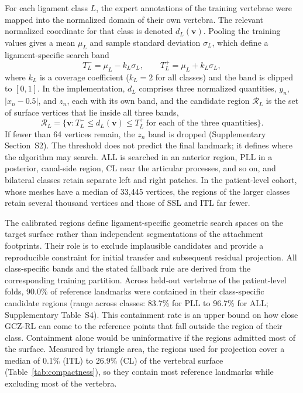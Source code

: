 \documentclass[5p,times,twocolumn,authoryear]{elsarticle}
\newif\ifhighlight
\newcommand{\rev}[1]{\ifhighlight{\color{revcolor}#1}\else#1\fi}
\begin{document}
For each ligament class $L$, the expert annotations of the training vertebrae were mapped into the normalized domain of their own vertebra. The relevant normalized coordinate for that class is denoted $d_L(\mathbf{v})$. Pooling the training values gives a mean $\mu_L$ and sample standard deviation $\sigma_L$, which define a ligament-specific search band
\begin{equation}
  T_L^- = \mu_L - k_L\sigma_L, \qquad
  T_L^+ = \mu_L + k_L\sigma_L ,
  \label{eq:threshold_band}
\end{equation}
where $k_L$ is a coverage coefficient ($k_L=2$ for all classes) and the band is clipped to $[0,1]$. In the implementation, $d_L$ comprises three normalized quantities, $y_n$, $|x_n-0.5|$, and $z_n$, each with its own band, and the candidate region $\mathcal{R}_L$ is the set of surface vertices that lie inside all three bands,
\begin{equation}
  \mathcal{R}_L = \{\mathbf{v} : T_L^- \le d_L(\mathbf{v}) \le T_L^+ \ \text{for each of the three quantities}\}.
  \label{eq:threshold_rule}
\end{equation}
If fewer than 64 vertices remain, the $z_n$ band is dropped (Supplementary Section~S2). The threshold does not predict the final landmark; it defines where the algorithm may search. ALL is searched in an anterior region, PLL in a posterior, canal-side region, CL near the articular processes, and so on, and bilateral classes retain separate left and right patches. In the patient-level cohort, whose meshes have a median of 33{,}445 vertices, the regions of the larger classes retain several thousand vertices and those of SSL and ITL far fewer.

The calibrated regions define ligament-specific geometric search spaces on the target surface rather than independent segmentations of the attachment footprints. Their role is to exclude implausible candidates and provide a reproducible constraint for initial transfer and subsequent residual projection. All class-specific bands and the stated fallback rule are derived from the corresponding training partition. Across held-out vertebrae of the patient-level folds, 90.0\% of reference landmarks were contained in their class-specific candidate regions (range across classes: 83.7\% for PLL to 96.7\% for ALL; Supplementary Table~S4). This containment rate is an upper bound on how close GCZ-RL can come to the reference points that fall outside the region of their class. \rev{Containment alone would be uninformative if the regions admitted most of the surface. Measured by triangle area, the regions used for projection cover a median of 0.1\% (ITL) to 26.9\% (CL) of the vertebral surface (Table~\ref{tab:compactness}), so they contain most reference landmarks while excluding most of the vertebra.}
\end{document}
